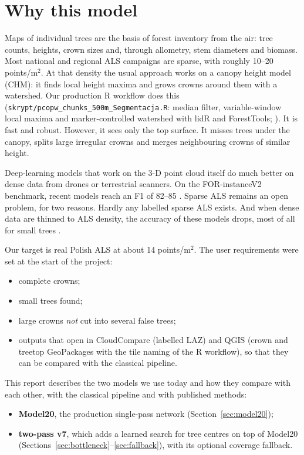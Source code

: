 \documentclass[11pt,a4paper]{article}
\newcommand{\ppsm}{points/m$^2$}
\newcommand{\code}[1]{\texttt{#1}}
\begin{document}
\section{Why this model}

Maps of individual trees are the basis of forest inventory from the air: tree counts, heights, crown sizes and, through allometry, stem diameters and biomass. Most national and regional ALS campaigns are sparse, with roughly 10--20 \ppsm. At that density the usual approach works on a canopy height model (CHM): it finds local height maxima and grows crowns around them with a watershed. Our production R workflow does this (\code{skrypt/pcopw\_chunks\_500m\_Segmentacja.R}: median filter, variable-window local maxima and marker-controlled watershed with lidR and ForestTools; \citealp{roussel2020lidr,plowright2023foresttools}). It is fast and robust. However, it sees only the top surface. It misses trees under the canopy, splits large irregular crowns and merges neighbouring crowns of similar height.

Deep-learning models that work on the 3-D point cloud itself do much better on dense data from drones or terrestrial scanners. On the FOR-instanceV2 benchmark, recent models reach an F1 of 82--85 \citep{xiang2025ff3d,wielgosz2026satv2}. Sparse ALS remains an open problem, for two reasons. Hardly any labelled sparse ALS exists. And when dense data are thinned to ALS density, the accuracy of these models drops, most of all for small trees \citep{wielgosz2024sat,ruoppa2025fgiemit}.

Our target is real Polish ALS at about 14 \ppsm. The user requirements were set at the start of the project:
\begin{itemize}
  \item complete crowns;
  \item small trees found;
  \item large crowns \emph{not} cut into several false trees;
  \item outputs that open in CloudCompare (labelled LAZ) and QGIS (crown and treetop GeoPackages with the tile naming of the R workflow), so that they can be compared with the classical pipeline.
\end{itemize}

This report describes the two models we use today and how they compare with each other, with the classical pipeline and with published methods:
\begin{itemize}
  \item \textbf{Model20}, the production single-pass network (Section~\ref{sec:model20});
  \item \textbf{two-pass v7}, which adds a learned search for tree centres on top of Model20 (Sections~\ref{sec:bottleneck}--\ref{sec:fallback}), with its optional coverage fallback.
\end{itemize}
\end{document}
